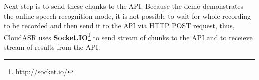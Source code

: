 Next step is to send these chunks to the API.
Because the demo demonstrates the online speech recognition mode,
  it is not possible to wait for whole recording to be recorded and then send it to the API via HTTP POST request,
  thus, CloudASR uses \textbf{Socket.IO}\footnote{\url{http://socket.io/}} to send stream of chunks to the API
  and to receieve stream of results from the API.

